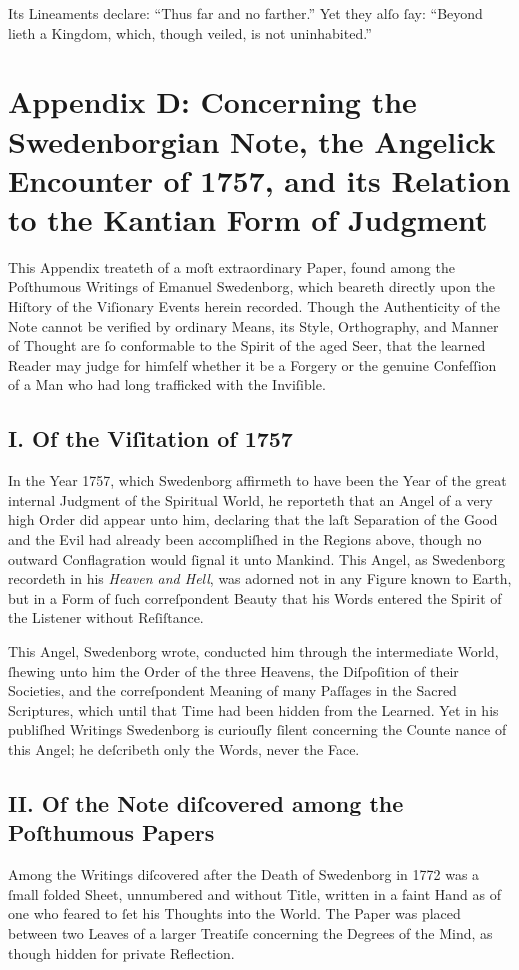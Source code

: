 \documentclass[12pt]{article}
\begin{document}
Its Lineaments declare: ``Thus far and no farther.'' Yet they alſo ſay: 
``Beyond lieth a Kingdom, which, though veiled, is not uninhabited.''

\newpage

\section*{Appendix D: Concerning the Swedenborgian Note, the Angelick Encounter of 1757, and its Relation to the Kantian Form of Judgment}

This Appendix treateth of a moſt extraordinary Paper, found among the 
Poſthumous Writings of Emanuel Swedenborg, which beareth directly upon the 
Hiſtory of the Viſionary Events herein recorded. Though the Authenticity of 
the Note cannot be verified by ordinary Means, its Style, Orthography, and 
Manner of Thought are ſo conformable to the Spirit of the aged Seer, that 
the learned Reader may judge for himſelf whether it be a Forgery or the 
genuine Confeſſion of a Man who had long trafficked with the Inviſible.

\subsection*{I. Of the Viſitation of 1757}
In the Year 1757, which Swedenborg affirmeth to have been the Year of the 
great internal Judgment of the Spiritual World, he reporteth that an Angel of 
a very high Order did appear unto him, declaring that the laſt Separation of 
the Good and the Evil had already been accompliſhed in the Regions above, 
though no outward Conflagration would ſignal it unto Mankind. This Angel, as 
Swedenborg recordeth in his \textit{Heaven and Hell}, was adorned not in any 
Figure known to Earth, but in a Form of ſuch correſpondent Beauty that his 
Words entered the Spirit of the Listener without Reſiſtance.

This Angel, Swedenborg wrote, conducted him through the intermediate World, 
ſhewing unto him the Order of the three Heavens, the Diſpoſition of their 
Societies, and the correſpondent Meaning of many Paſſages in the Sacred 
Scriptures, which until that Time had been hidden from the Learned. Yet in 
his publiſhed Writings Swedenborg is curiouſly ſilent concerning the Counte­
nance of this Angel; he deſcribeth only the Words, never the Face.

\subsection*{II. Of the Note diſcovered among the Poſthumous Papers}
Among the Writings diſcovered after the Death of Swedenborg in 1772 was a 
ſmall folded Sheet, unnumbered and without Title, written in a faint Hand as 
of one who feared to ſet his Thoughts into the World. The Paper was placed 
between two Leaves of a larger Treatiſe concerning the Degrees of the Mind, 
as though hidden for private Reflection.
\end{document}
